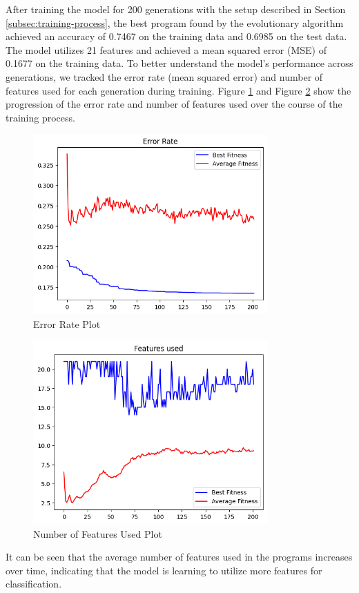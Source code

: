 \documentclass{article}
\begin{document}
After training the model for 200 generations with the setup described in Section \ref{subsec:training-process}, the best program found by the evolutionary algorithm achieved an accuracy of 0.7467 on the training data and 0.6985 on the test data. The model utilizes 21 features and achieved a mean squared error (MSE) of 0.1677 on the training data.
To better understand the model's performance across generations, we tracked the error rate (mean squared error) and number of features used for each generation during training. 
Figure \ref{fig:error-rate-plot} and Figure \ref{fig:feature-plot} show the progression of the error rate and number of features used over the course of the training process.
\begin{figure}[h] 
    \centering 
    \includegraphics[width=0.8\textwidth]{./figures/error-rate-plot.png} 
    \caption{Error Rate Plot} 
    \label{fig:error-rate-plot}
\end{figure}
\begin{figure}[h] 
    \centering 
    \includegraphics[width=0.8\textwidth]{./figures/feature-used-plot.png} 
    \caption{Number of Features Used Plot} 
    \label{fig:feature-plot}
\end{figure}
It can be seen that the average number of features used in the programs increases over time, indicating that the model is learning to utilize more features for classification.
\end{document}
